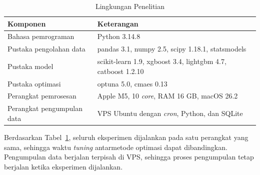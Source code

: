 \begin{table}[htbp]
  \caption{Lingkungan Penelitian}
  \label{tab:lingkungan}
  \centering
  \begingroup
  \footnotesize
  \begin{tabular}{|>{\raggedright\arraybackslash}p{}%
                  |>{\raggedright\arraybackslash}p{}|}
    \hline
    \textbf{Komponen} & \textbf{Keterangan} \\
    \hline
    Bahasa pemrograman & Python 3.14.8 \\
    \hline
    Pustaka pengolahan data & pandas 3.1, numpy 2.5, scipy 1.18.1,
    statsmodels \\
    \hline
    Pustaka model & scikit-learn 1.9, xgboost 3.4, lightgbm 4.7,
    catboost 1.2.10 \\
    \hline
    Pustaka optimasi & optuna 5.0, cmaes 0.13 \\
    \hline
    Perangkat pemrosesan & Apple M5, 10 \textit{core}, RAM 16 GB,
    macOS 26.2 \\
    \hline
    Perangkat pengumpulan data & VPS Ubuntu dengan \textit{cron}, Python, dan
    SQLite \\
    \hline
  \end{tabular}
  \endgroup
\end{table}

Berdasarkan Tabel~\ref{tab:lingkungan}, seluruh eksperimen dijalankan pada satu perangkat yang sama, sehingga waktu
\textit{tuning} antarmetode optimasi dapat dibandingkan. Pengumpulan data berjalan
terpisah di VPS, sehingga proses pengumpulan tetap berjalan ketika eksperimen
dijalankan.
